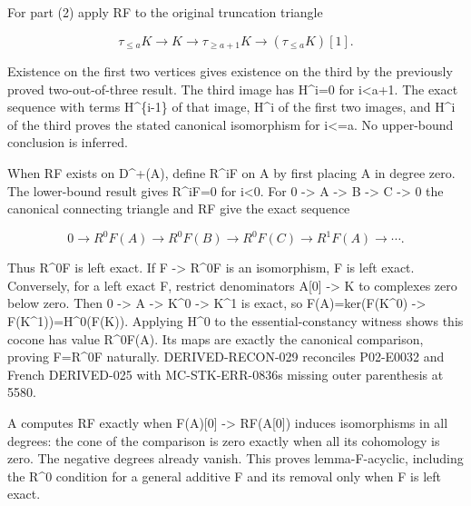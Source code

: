 For part (2)\allowbreak{} apply RF to the original truncation triangle

\[
 \tau_{\le a}K\longrightarrow K\longrightarrow\tau_{\ge a+1}K
                      \longrightarrow(\tau_{\le a}K)[1].       \tag{4.1}
\]

Existence on the first two vertices gives existence on the third by the previously proved two-out-of-three result. The third image has H\textasciicircum{}i\allowbreak{}=0 for i<a\allowbreak{}+1. The exact sequence with terms H\^{}\{i-1\} of that image,\allowbreak{} H\^{}i of the first two images,\allowbreak{} and H\^{}i of the third proves the stated canonical isomorphism for i<\allowbreak{}=a. No upper-bound conclusion is inferred.

When RF exists on D\textasciicircum{}\allowbreak{}+(A)\allowbreak{},\allowbreak{} define R\^{}iF on A by first placing A in degree zero. The lower-bound result gives R\textasciicircum{}iF\allowbreak{}=0 for i\textless0. For 0 \allowbreak{}-> A \allowbreak{}-> B \allowbreak{}-> C \allowbreak{}-> 0 the canonical connecting triangle and RF give the exact sequence

\[
 0\to R^0F(A)\to R^0F(B)\to R^0F(C)\to R^1F(A)\to\cdots.
\]

Thus R\^{}0F is left exact. If F \allowbreak{}-> R\^{}0F is an isomorphism,\allowbreak{} F is left exact. Conversely,\allowbreak{} for a left exact F,\allowbreak{} restrict denominators A[0]\allowbreak{} \allowbreak{}-> K to complexes zero below zero. Then 0 \allowbreak{}-> A \allowbreak{}-> K\^{}0 \allowbreak{}-> K\^{}1 is exact,\allowbreak{} so F(A)\allowbreak{}\allowbreak{}=ker(F(K\textasciicircum{}0)\allowbreak{} \allowbreak{}-> F(K\textasciicircum{}1)\allowbreak{})\allowbreak{}\allowbreak{}=H\textasciicircum{}0(F(K)\allowbreak{})\allowbreak{}. Applying H\^{}0 to the essential-constancy witness shows this cocone has value R\textasciicircum{}0F(A)\allowbreak{}. Its maps are exactly the canonical comparison,\allowbreak{} proving F\allowbreak{}=R\textasciicircum{}0F naturally. DERIVED-RECON-029 reconciles P02-E0032 and French DERIVED-025 with MC-STK-ERR-0836\textquotesingle s missing outer parenthesis at 5580.

A computes RF exactly when F(A)\allowbreak{}[0]\allowbreak{} \allowbreak{}-> RF(A[0]\allowbreak{})\allowbreak{} induces isomorphisms in all degrees:\allowbreak{} the cone of the comparison is zero exactly when all its cohomology is zero. The negative degrees already vanish. This proves lemma-F-acyclic,\allowbreak{} including the R\^{}0 condition for a general additive F and its removal only when F is left exact.

